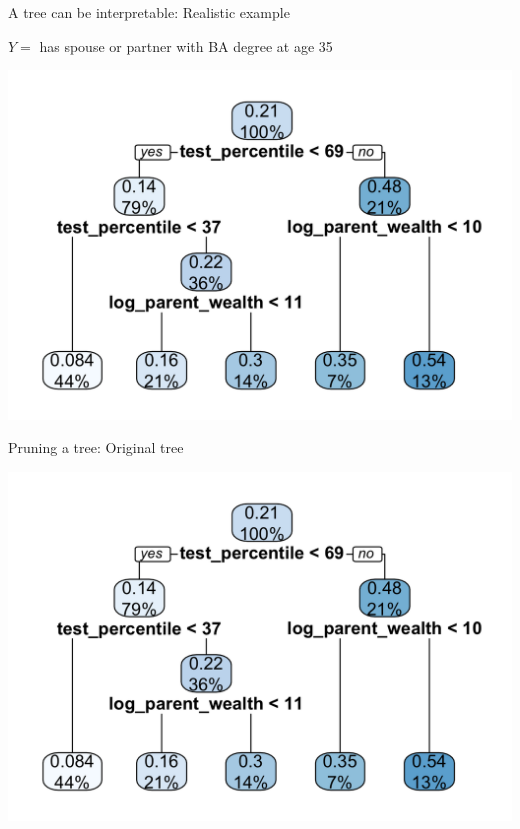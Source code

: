 \documentclass{beamer}
\begin{document}
\begin{frame}{A tree can be interpretable: Realistic example}

$Y = $ has spouse or partner with BA degree at age 35

\includegraphics[width = \textwidth]{figures/tree_fitting_figure}

\end{frame}


\begin{frame}{Pruning a tree: Original tree}

\includegraphics[width = \textwidth]{figures/tree_fitting_figure}

\end{frame}
\end{document}
